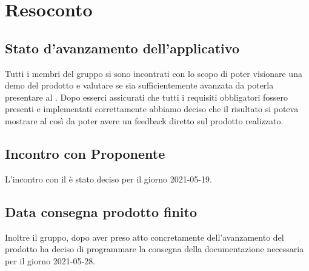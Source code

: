 \section{Resoconto}

\subsection{Stato d'avanzamento dell'applicativo}
Tutti i membri del gruppo si sono incontrati con lo scopo di poter visionare una demo del prodotto e valutare se sia sufficientemente avanzata da poterla presentare al \proponProg. 
Dopo esserci assicurati che tutti i requisiti obbligatori fossero presenti e implementati correttamente abbiamo deciso che il risultato si poteva mostrare al \proponProg{} così da poter avere un feedback diretto sul prodotto realizzato.\\
\subsection{Incontro con Proponente}
L'incontro con il \proponProg{}  è stato deciso per il giorno 2021-05-19.\\
\subsection{Data consegna prodotto finito}
Inoltre il gruppo, dopo aver preso atto concretamente dell'avanzamento del prodotto ha deciso di programmare la consegna della documentazione necessaria per il giorno 2021-05-28.